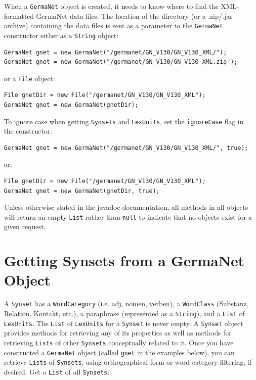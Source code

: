\documentclass[12pt,a4paper,english,utf8]{report}
\begin{document}
When a \texttt{GermaNet} object is created, it needs to know where to find the XML-formatted GermaNet data files. The location of the directory (or a .zip/.jar archive) containing the data files is sent as a parameter to the \texttt{GermaNet} constructor either as a \texttt{String} object:

\begin{lstlisting}
GermaNet gnet = new GermaNet("/germanet/GN_V130/GN_V130_XML/");
GermaNet gnet = new GermaNet("/germanet/GN_V130/GN_V130_XML.zip");
\end{lstlisting}

or a \texttt{File} object:

\begin{lstlisting}
File gnetDir = new File("/germanet/GN_V130/GN_V130_XML");
GermaNet gnet = new GermaNet(gnetDir);
\end{lstlisting}

To ignore case when getting \texttt{Synsets} and \texttt{LexUnits}, set the \texttt{ignoreCase} flag in the constructor:

\begin{lstlisting}
GermaNet gnet = new GermaNet("/germanet/GN_V130/GN_V130_XML/", true);
\end{lstlisting}

or:

\begin{lstlisting}
File gnetDir = new File("/germanet/GN_V130/GN_V130_XML");
GermaNet gnet = new GermaNet(gnetDir, true);
\end{lstlisting}

Unless otherwise stated in the javadoc documentation, all methods in all objects will return an empty \texttt{List} rather than \texttt{null} to indicate that no objects exist for a given request.



\section{Getting Synsets from a GermaNet Object}

A \texttt{Synset} has a \texttt{WordCategory} (i.e. adj, nomen, verben), a \texttt{WordClass} (Substanz, Relation, Kontakt, etc.), a paraphrase (represented as a \texttt{String}), and a \texttt{List} of \texttt{LexUnits}. The \texttt{List} of \texttt{LexUnits} for a \texttt{Synset} is never empty.
A \texttt{Synset} object provides methods for retrieving any of its properties as well as methods for retrieving \texttt{Lists} of other \texttt{Synsets} conceptually related to it. Once you have constructed a \texttt{GermaNet} object (called \texttt{gnet} in the examples below), you can retrieve \texttt{Lists} of \texttt{Synsets}, using orthographical form or word category filtering, if desired.
Get a \texttt{List} of all \texttt{Synsets}:
\end{document}
